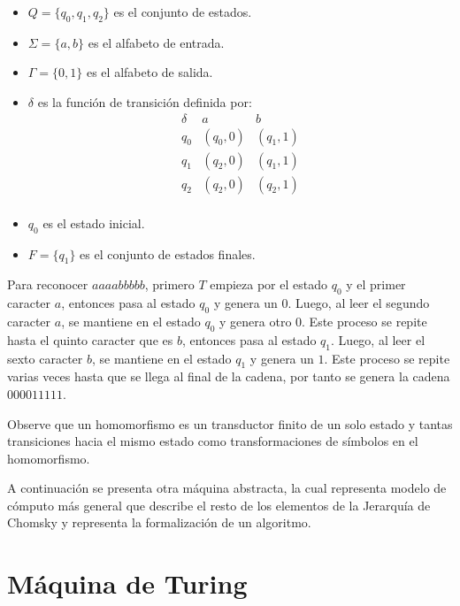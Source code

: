 \documentclass[12pt]{article}
\begin{document}
\begin{itemize}
      \item \(Q = \{q_0, q_1, q_2\}\) es el conjunto de estados.
      \item \(\Sigma = \{a, b\}\) es el alfabeto de entrada.
      \item \(\Gamma = \{0, 1\}\) es el alfabeto de salida.
      \item \(\delta\) es la función de transición definida por:
            \[
                  \begin{array}{c|c|c}
                        \delta & a        & b        \\
                        \hline
                        q_0    & (q_0, 0) & (q_1, 1) \\
                        q_1    & (q_2, 0) & (q_1, 1) \\
                        q_2    & (q_2, 0) & (q_2, 1) \\
                  \end{array}
            \]
      \item \(q_0\) es el estado inicial.
      \item \(F = \{q_1\}\) es el conjunto de estados finales.
\end{itemize}

Para reconocer $aaaabbbbb$, primero $T$ empieza por el estado $q_0$ y el primer caracter $a$, entonces pasa al estado $q_0$ y genera un $0$.
Luego, al leer el segundo caracter $a$, se mantiene en el estado $q_0$ y genera otro $0$. Este proceso se repite hasta el quinto caracter
que es $b$, entonces pasa al estado $q_1$. Luego, al leer el sexto caracter $b$, se mantiene en el estado $q_1$ y genera un $1$. Este proceso
se repite varias veces hasta que se llega al final de la cadena, por tanto se genera la cadena $000011111$.

Observe que un homomorfismo es un transductor finito de un solo estado y tantas transiciones hacia el mismo estado como transformaciones de símbolos en el homomorfismo.

A continuación se presenta otra máquina abstracta, la cual representa modelo de cómputo más general que describe el resto de los elementos de la Jerarquía de Chomsky y 
representa la formalización de un algoritmo.


\section{Máquina de Turing}
\end{document}
